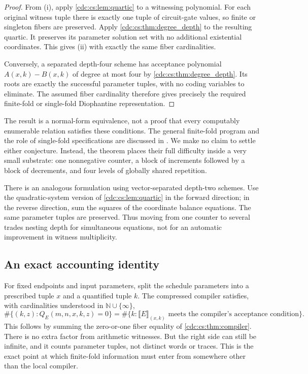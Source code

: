 \documentclass[11pt,a4paper]{article}
\theoremstyle{definition}
\theoremstyle{remark}
\newcommand{\N}{\mathbb N}
\begin{document}
\begin{proof}
From (i), apply \cref{cdc:cs:lem:quartic} to a witnessing polynomial. For each
original witness tuple there is exactly one tuple of circuit-gate values, so
finite or singleton fibers are preserved. Apply
\cref{cdc:cs:thm:degree_depth} to the resulting quartic. It preserves its parameter
solution set with no additional existential coordinates. This gives (ii)
with exactly the same fiber cardinalities.

Conversely, a separated depth-four scheme has acceptance polynomial
$A(x,k)-B(x,k)$ of degree at most four by
\cref{cdc:cs:thm:degree_depth}. Its roots are exactly the successful parameter
tuples, with no coding variables to eliminate. The assumed fiber cardinality
therefore gives precisely the required finite-fold or single-fold
Diophantine representation.
\end{proof}

The result is a normal-form equivalence, not a proof that every computably
enumerable relation satisfies these conditions. The general finite-fold
program and the role of single-fold specifications are discussed in
\cite{mat2010,cco2024}. We make no claim to settle either
conjecture. Instead, the theorem places their full difficulty inside a very
small substrate: one nonnegative counter, a block of increments followed by a
block of decrements, and four levels of globally shared repetition.

There is an analogous formulation using vector-separated depth-two schemes.
Use the quadratic-system version of \cref{cdc:cs:lem:quartic} in the forward
direction; in the reverse direction, sum the squares of the coordinate
balance equations. The same parameter tuples are preserved. Thus moving from
one counter to several trades nesting depth for simultaneous equations, not
for an automatic improvement in witness multiplicity.

\subsection{An exact accounting identity}

For fixed endpoints and input parameters, split the schedule parameters into
a prescribed tuple $x$ and a quantified tuple $k$. The compressed compiler
satisfies, with cardinalities understood in $\N\cup\{\infty\}$,
\begin{equation}
\label{cdc:cs:eq:fibercount}
\#\{(k,z):Q_E(m,n,x,k,z)=0\}
=
\#\{k:\llbracket E\rrbracket_{(x,k)}
\text{ meets the compiler's acceptance condition}\}.
\end{equation}
This follows by summing the zero-or-one fiber equality of
\cref{cdc:cs:thm:compiler}. There is no extra factor from arithmetic witnesses.
But the right side can still be infinite, and it counts parameter tuples,
not distinct words or traces. This is the exact point at which finite-fold
information must enter from somewhere other than the local compiler.
\end{document}

